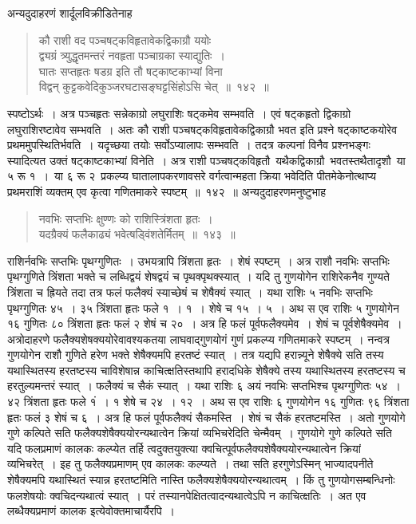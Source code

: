 \documentclass[11pt, openany]{book}
\begin{document}
\vspace{-2mm}
 अन्यदुदाहरणं शार्दूलविक्रीडितेनाह\textendash
 \begin{quote}
     \eg 
 कौ राशी वद पञ्चषट्कविहृतावेकद्विकाग्रौ ययोः\\
 द्व्यग्रं त्र्युद्धृतमन्तरं नवहृता पञ्चाग्रका स्याद्युतिः~।\\
 घातः सप्तहृतः षडग्र इति तौ षट्काष्टकाभ्यां विना\\
 विद्वन् कुट्टकवेदिकुञ्जरघटासङ्घट्टसिंहोऽसि चेत्~॥~१४२~॥
 \end{quote}

 स्पष्टोऽर्थः~। अत्र पञ्चहृतः सन्नेकाग्रो लघुराशिः षट्कमेव सम्भवति~।
एवं षट्कहृतो द्विकाग्रो लघुराशिरष्टावेव सम्भवति~। अतः कौ राशी
पञ्चषट्कविहृतावेकद्विकाग्रौ भवत इति प्रश्ने षट्काष्टकयोरेव
प्रथममुपस्थितिर्भवति~। यदृच्छया तयोः सर्वोऽप्यालापः सम्भवति~। तदत्र कल्पनां विनैव प्रश्नभङ्गः स्यादित्यत उक्तं षट्काष्टकाभ्यां विनेति~। अत्र राशी पञ्चषट्कविहृतौ \,यथैकद्विकाग्रौ \,भवतस्तथैतादृशौ \,या ५ रू १~। \,या ६ रू २ \,प्रकल्प्य घातालापकरणावसरे वर्गत्वान्महता क्रिया भवेदिति
पीतमेकेनोत्थाप्य प्रथमराशिं व्यक्तम् एव कृत्वा गणितमाकरे स्पष्टम्~॥~१४२~॥
\newpage%
 अन्यदुदाहरणमनुष्टुभाह\textendash
\begin{quote}
    \eg 
     नवभिः सप्तभिः क्षुण्णः को राशिस्त्रिंशता हृतः~।\\
 यदग्रैक्यं फलैकाढ्यं भवेत्षड्विंशतेर्मितम्~॥~१४३~॥~
\end{quote}

 राशिर्नवभिः सप्तभिः पृथग्गुणितः~। उभयत्रापि त्रिंशता हृतः~। शेषं
स्पष्टम्~। अत्र राशौ नवभिः सप्तभिः पृथग्गुणिते त्रिंशता भक्ते च लब्धिद्वयं
शेषद्वयं च पृथक्पृथक्स्यात्~। यदि तु गुणयोगेन राशिरेकनैव गुण्यते त्रिंशता च ह्रियते
तदा तत्र फलं फलैक्यं स्याच्छेषं च शेषैक्यं स्यात्~। यथा राशिः ५ नवभिः
सप्तभिः पृथग्गुणितः ४५~। ३५ त्रिंशता हृतः फले १~। १~। शेषे च १५~। ५~। अथ स एव राशिः ५ गुणयोगेन १६ गुणितः ८० त्रिंशता हृतः फलं २ शेषं च २०~। अत्र
हि फलं पूर्वफलैक्यमेव~। शेषं च पूर्वशेषैक्यमेव~। अत्रोदाहरणे
फलैक्यशेषक्ययोरेवावश्यकतया लाघवाद्गुणयोगं गुणं प्रकल्प्य गणितमाकरे स्पष्टम्~।
नन्वत्र
गुणयोगेन राशौ गुणिते हरेण भक्ते शेषैक्यमपि हरतष्टं स्यात्~। तत्र
यद्यपि
हरान्न्यूने शेषैक्ये सति तस्य यथास्थितस्य हरतष्टस्य चाविशेषान्न
काचित्क्षतिस्तथापि
हरादधिके शेषैक्ये तस्य यथास्थितस्य हरतष्टस्य च हरतुल्यमन्तरं स्यात्~।
फलैक्यं  च
सैकं स्यात्~। यथा राशिः ६ अयं नवभिः सप्तभिश्च पृथग्गुणितः ५४~। ४२
त्रिंशता हृतः फले १ं~। १ शेषे च २४~। १२~। अथ स एव राशिः ६ गुणयोगेन १६
गुणितः ९६ त्रिंशता हृतः फलं ३ शेषं च ६~। अत्र हि फलं पूर्वफलैक्यं सैकमस्ति~।
शेषं च सैकं हरतष्टमस्ति~। अतो गुणयोगे गुणे कल्पिते सति
फलैक्यशेषैक्ययोरन्यथात्वेन क्रियां व्यभिचरेदिति चेन्मैवम्~। गुणयोगे गुणे कल्पिते सति यदि
फलप्रमाणं कालकः  कल्प्येत तर्हि त्वदुक्तयुक्त्या
क्वचित्पूर्वफलैक्यशेषैक्ययोरन्यथात्वेन
क्रियां व्यभिचरेत्~। इह तु फलैक्यप्रमाणम् एव कालकः कल्प्यते~। तथा सति
हरगुणेऽस्मिन् भाज्यादपनीते शेषैक्यमपि यथास्थितं  स्यान्न हरतष्टमिति नास्ति फलैक्यशेषैक्ययोरन्यथात्वम्~। किं तु गुणयोगसम्बन्धिनोः फलशेषयोः
क्वचिदन्यथात्वं स्यात्~। परं तस्यानपेक्षितत्वादन्यथात्वेऽपि न काचित्क्षतिः~। अत एव
लब्धैक्यप्रमाणं कालक इत्येवोक्तमाचार्यैरपि~।\\
\end{document}
